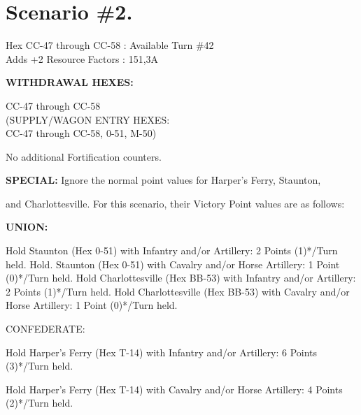 \section{Scenario \#2.
}


\begin{scenariodata}
Hex CC-47 through CC-58 : Available Turn \#42\\
Adds +2 Resource Factors : 151,3A\\
\end{scenariodata}

\begin{scenariodata}
\textbf{WITHDRAWAL HEXES:}\\
\end{scenariodata}

\begin{scenariodata}
CC-47 through CC-58\\
(SUPPLY/WAGON ENTRY HEXES:\\
CC-47 through CC-58, 0-51, M-50)\\
\end{scenariodata}

\begin{scenariodata}
No additional Fortification counters.\\
\end{scenariodata}

\begin{scenariodata}
\textbf{SPECIAL:} Ignore the normal point values for Harper's Ferry, Staunton,\\
\end{scenariodata}

and Charlottesville. For this scenario, their Victory Point values are as follows:

\begin{scenariodata}
\textbf{UNION:}\\
\end{scenariodata}

Hold Staunton (Hex 0-51) with Infantry and/or Artillery: 2 Points (1)*/Turn held. Hold. Staunton (Hex 0-51) with Cavalry and/or Horse Artillery: 1 Point (0)*/Turn held. Hold Charlottesville (Hex BB-53) with Infantry and/or Artillery: 2 Points (1)*/Turn held. Hold Charlottesville (Hex BB-53) with Cavalry and/or Horse Artillery: 1 Point (0)*/Turn held.

CONFEDERATE:

Hold Harper's Ferry (Hex T-14) with Infantry and/or Artillery: 6 Points (3)*/Turn held.

Hold Harper's Ferry (Hex T-14) with Cavalry and/or Horse Artillery: 4 Points (2)*/Turn held.

